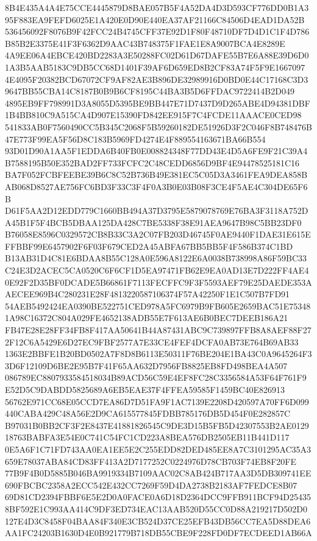\documentclass[UTF8,fontset=fandol,zihao=-4,a4paper]{ctexart}
\begin{document}
{{8B4E435A4A4E75CCE4445879D8BAE057B5F4A52DA4D3D593CF776DD0B1A395F883EA9FEFD6025E1A420E0D90E440EA37AF21166C84506D4EAD1DA52B
536456092F8076B9F42FCC24B4745CFF37E92D1F80F48710DF7D4D1C1F4D786B85B2E3375E41F3F6362D9AAC43B748375F1FAE1E8A9007BCA4E8289E
4A9EE06A4EBCE420BD2283A3E50288FC02D61D67DAFE55B7E6A88E39D6D01A3B5AAB5183C9DB5CC68D1401F39AF6D659ED8B2CF83A74F5F9E1667097
4E4095F20382BCD67072CF9AF82AE3B896DE32989916D0BD0E44C17168C3D39647BB55CBA14C8187B0B9B6CF8195C44BA3B5D6FFDAC9722414B2D049
4895EB9FF798991D3A8055D5395BE9BB447E71D7437D9D265ABE4D94381DBF1B4BB810C9A515CA4D907E15390FD842EE915F7C4FCDE11AAACE0CED98
541833AB0F7560490CC5B345C2068F5B59260182DE51926D3F2C046F8B748476B47E773F99EA5F56D8C183B5969FD4274E4F889554163671BA66B554
93D01D90A1AA5F1EDDA6B40FB0E008824348F77DD43E4D5A6FE9F21C39A4B7588195B50E352BAD2FF733FCFC2C48CEDD6856D9BF4E94478525181C16
BA7F052FCBFEEBE39B6C8C52B736B49E381EC5C05D3A3461FEA9DEA858BAB068D8527AE756FC6BD3F33C3F4F0A3B0E03B08F3CE4F5AE4C304DE65F6B
D61F5AA2D12EDD779C1660BB494A37D3795E5879078769E76BA3F3118A752DA45B1F5F4BCB5DBAA125DA428C7BE5338F38E91AEA9647B98C5BB23DF0
B76058E8596C0329572CB8B33C3A2C07FB203D46745F0AE9440F1DAE31E615EFFBBF99E6457902F6F03F679CED2A45ABFA67BB5BB5F4F586B374C1BD
B13AB31D4C81E6BDAA8B55C128A0E596A8122E6A0038B738998A86F59BC33C24E3D2ACEC5CA0520C6F6CF1D5EA97471FB62E9EA0AD13E7D222FF4AE4
0E92F2D35BF0DCADE5B66861F7113FECFFC9F3F5593AEF79E25DAEDE353AAECEE969B4C280231E28F4813220587106374F57A42250F1E1C507B7FD91
54AEB5492424EA0390BE522751CED978A5FC6979B9FB605E2659BAC51E753481A98C16372C804A029FE4652138ADB55E7F613AE6B0BEC7DEEB186A21
FB47E28E28FF34FB8F417AA50641B44A87431ABC9C739897FFB8A8AEF88F272F12C6A5429E6D27EC9FBF2577A7E33CE4FEF4DCFA0AB73E764B69AB33
1363E2BBFE1B20BD0502A7F8D8B6113E50311F76BE204E1BA43C0A9645264F33D6F12109D6BE2E95B7F41F65AA632D7956FB8825EB8FD498BEA4A507
086789EC8807933584518034B89ACD56C59E4EF8FC28C3356584A53F64F761F9E52D5C9DABDD5825689A6EB5EAE37F4FFEA59585F1459BC40E826913
56762E971CC68E05CCD7EA86D7D51FA9F1AC7139E2208D420597A70FF6D099440CABA429C48A56E2D9CA615577845FDBB785176DB5D454F0E282857C
B97031B0BB2CF3F2E8437E41881826545C9DE3D15B5FB5D42307553B2AE012918763BABFA3E54E0C741C54FC1CD223A8BEA576DB2505EB11B441D117
0E5A6F1C71FD743AA0EA1EE5E2C255EDD82DED485EE8A7C3101295AC35A3659E78037ABA84CD83FF413A2D7177252C0224976D78CB703F74EB8F20FE
77B9F4B0D5885B046BA9919334B7109AAC02C8AB424B717AA3D5DB309741EE690FBCBC2358A2ECC542E432CC7269F59D4DA2738B2183AF7FEDCE8B07
69D81CD2394FBBF6E5E2D0A0FACE0A6D18D2364DCC9FFB911BCF94D254358BF592E1C993AA414C9DF3ED734EAC13AAB520D55CC0D88A219217D502D0
127E4D3C8458F04BAA84F340E3CB524D37CE25EFB43DB56CC7EA5D88DEA6AA1FC24203B1630D4E0B921779B718DB55CBE9F228FD0DF7ECDEED1AB66A
}}
\end{document}
